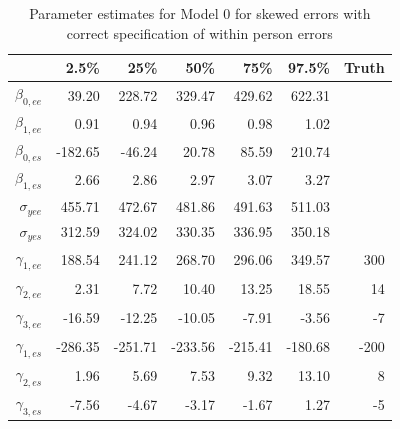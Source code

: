 \documentclass[11pt]{article}\usepackage[]{graphicx}\usepackage[]{color}
\begin{document}
\begin{table}[ht]
\centering
\begin{tabular}{rrrrrr|r}
  \hline
 & 2.5\% & 25\% & 50\% & 75\% & 97.5\% & Truth\\ 
  \hline
$\beta_{0,ee}$ & 39.20 & 228.72 & 329.47 & 429.62 & 622.31 \\ 
  $\beta_{1,ee}$ & 0.91 & 0.94 & 0.96 & 0.98 & 1.02 \\ 
  $\beta_{0,es}$ & -182.65 & -46.24 & 20.78 & 85.59 & 210.74 \\ 
  $\beta_{1,es}$ & 2.66 & 2.86 & 2.97 & 3.07 & 3.27 \\ 
  $\sigma_{yee}$ & 455.71 & 472.67 & 481.86 & 491.63 & 511.03 \\ 
  $\sigma_{yes}$ & 312.59 & 324.02 & 330.35 & 336.95 & 350.18 \\ 
  $\gamma_{1,ee}$ & 188.54 & 241.12 & 268.70 & 296.06 & 349.57 & 300\\ 
  $\gamma_{2,ee}$ & 2.31 & 7.72 & 10.40 & 13.25 & 18.55 & 14\\ 
  $\gamma_{3,ee}$ & -16.59 & -12.25 & -10.05 & -7.91 & -3.56 & -7\\ 
  $\gamma_{1,es}$ & -286.35 & -251.71 & -233.56 & -215.41 & -180.68 & -200\\ 
  $\gamma_{2,es}$ & 1.96 & 5.69 & 7.53 & 9.32 & 13.10 & 8\\ 
  $\gamma_{3,es}$ & -7.56 & -4.67 & -3.17 & -1.67 & 1.27 & -5\\ 
   \hline
   \end{tabular}
\caption{Parameter estimates for Model 0 for skewed errors with correct specification of within person errors}
\label{m0swpestimates}
\end{table}
\end{document}
